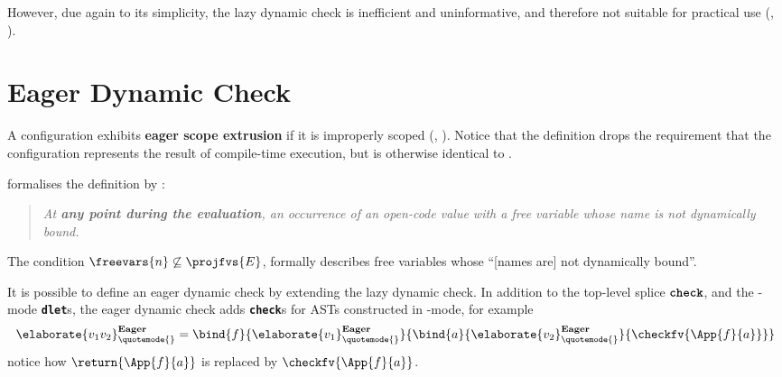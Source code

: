 However, due again to its simplicity, the lazy dynamic check is inefficient and uninformative, and therefore not suitable for practical use \citep{kiselyov-14} (, ).

\section{Eager Dynamic Check}\label{section:eager-dynamic-check-formal}
A configuration exhibits \textbf{eager scope extrusion} if it is improperly scoped (, ). Notice that the definition drops the requirement that the configuration represents the result of compile-time execution, but is otherwise identical to . 



 formalises the definition by \citet{kiselyov-14}:
\begin{quote}
  \textit{At \textbf{any point during the evaluation}, an occurrence of an open-code value with a free variable whose name is not dynamically bound.}
\end{quote}
The condition $\freevars{n} \not\subseteq \projfvs{E}$, formally describes free variables whose ``[names are] not dynamically bound''.

It is possible to define an eager dynamic check by extending the lazy dynamic check. In addition to the top-level splice $\textbf{\texttt{check}}$, and the \compilemode{}-mode \textbf{\texttt{dlet}}s, the eager dynamic check adds \textbf{\texttt{check}}s for ASTs constructed in \quotemode{}-mode, for example 
\[\elaborate{v_1 v_2}_{\quotemode{}}^{\textbf{Eager}} = \bind{f}{\elaborate{v_1}_{\quotemode{}}^{\textbf{Eager}}}{\bind{a}{\elaborate{v_2}_{\quotemode{}}^{\textbf{Eager}}}{\checkfv{\App{f}{a}}}}\]
notice how $\return{\App{f}{a}}$ is replaced by $\checkfv{\App{f}{a}}$. 

